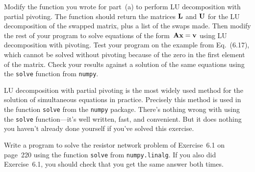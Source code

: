 \documentclass[12pt]{article}
\begin{document}
\begin{exercises}
\begin{enumerate}
  Modify the function you wrote for part~(a) to perform LU decomposition
  with partial pivoting.  The function should return the matrices $\mathbf{L}$
  and $\mathbf{U}$ for the LU decomposition of the swapped matrix, plus a list
  of the swaps made.  Then modify the rest of your program to solve
  equations of the form~$\mathbf{A}\mathbf{x}=\mathbf{v}$ using LU decomposition
  with pivoting.  Test your program on the example from Eq.~(6.17), which
  cannot be solved without pivoting because of the zero in the first
  element of the matrix.  Check your results against a solution of the same
  equations using the \verb|solve| function from \verb|numpy|.
\end{enumerate}
LU decomposition with partial pivoting is the most widely used method for
the solution of simultaneous equations in practice.  Precisely this method
is used in the function \verb|solve| from the \verb|numpy| package.
There's nothing wrong with using the \verb|solve| function---it's well
written, fast, and convenient.  But it does nothing you haven't already
done yourself if you've solved this exercise.



\exercise Write a program to solve the resistor network problem of
Exercise~6.1 on page~220 using the function \verb|solve| from
\verb|numpy.linalg|.  If you also did Exercise~6.1, you should check that
you get the same answer both times.




\end{exercises}
\end{document}
